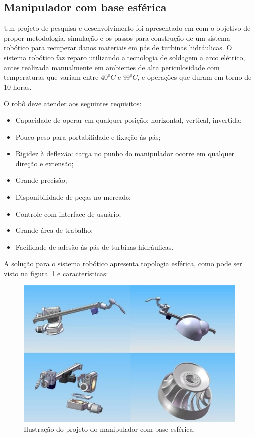 \subsection{Manipulador com base esférica}
Um projeto de pesquisa e desenvolvimento foi apresentado em
\cite{motta2010prototype} com o objetivo de propor metodologia, simulação e
os passos para construção de um sistema robótico para recuperar danos materiais
em pás de turbinas hidráulicas. O sistema robótico faz
reparo utilizando a tecnologia de soldagem a arco elétrico, antes realizada
manualmente em ambientes de alta periculosidade com temperaturas que variam
entre $40^o C$ e $99^o C$, e operações que duram em torno de 10 horas. 

O robô deve atender aos seguintes requisitos:
\begin{itemize}
  \item Capacidade de operar em qualquer posição: horizontal, vertical,
  invertida;
  \item Pouco peso para portabilidade e fixação às pás;
  \item Rigidez à deflexão: carga no punho do manipulador ocorre em qualquer
  direção e extensão;
  \item Grande precisão;
  \item Disponibilidade de peças no mercado;
  \item Controle com interface de usuário;
  \item Grande área de trabalho;
  \item Facilidade de adesão às pás de turbinas hidráulicas.
\end{itemize}

A solução para o sistema robótico apresenta topologia esférica, como pode ser
visto na figura~\ref{fig:esferico} e características:

\begin{figure}[ht]
\centering
\includegraphics[width=\columnwidth]{sota/figs/esferico/esferico.jpg}
\caption{Ilustração do projeto do manipulador com base esférica.}
\label{fig:esferico}
\end{figure}

